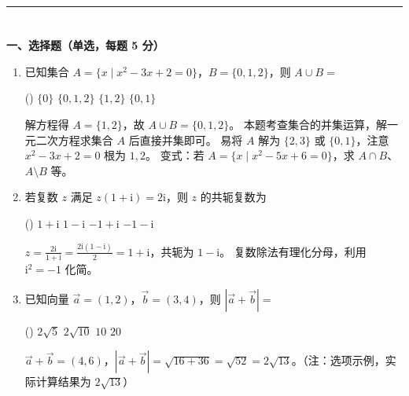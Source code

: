 \vspace{1em}
\hrule
\vspace{1em}


\ifdefined\tierA
\section*{\tierA}
\vspace{0.5em}

\noindent\textbf{一、选择题（单选，每题 5 分）}
\begin{enumerate}[itemsep=\mcqItemSep]
    \item 已知集合 $A=\{x \mid x^2-3x+2=0\}$，$B=\{0,1,2\}$，则 $A \cup B =$
    \begin{tasks}(\mcqTasksCols)
        \task $\{0\}$
        \task $\{0,1,2\}$
        \task $\{1,2\}$
        \task $\{0,1\}$
    \end{tasks}
    \begin{solution}
        \jieti 解方程得 $A=\{1,2\}$，故 $A\cup B=\{0,1,2\}$。
        \xijie 本题考查集合的并集运算，解一元二次方程求集合 $A$ 后直接并集即可。
        \cuowu 易将 $A$ 解为 $\{2,3\}$ 或 $\{0,1\}$，注意 $x^2-3x+2=0$ 根为 $1,2$。
        \jufa 变式：若 $A=\{x \mid x^2-5x+6=0\}$，求 $A\cap B$、$A\setminus B$ 等。
    \end{solution}

    \item 若复数 $z$ 满足 $z(1+\mathrm{i})=2\mathrm{i}$，则 $z$ 的共轭复数为
    \begin{tasks}(\mcqTasksCols)
        \task $1+\mathrm{i}$
        \task $1-\mathrm{i}$
        \task $-1+\mathrm{i}$
        \task $-1-\mathrm{i}$
    \end{tasks}
    \begin{solution}
        \jieti $z=\frac{2\mathrm{i}}{1+\mathrm{i}}=\frac{2\mathrm{i}(1-\mathrm{i})}{2}=1+\mathrm{i}$，共轭为 $1-\mathrm{i}$。
        \xijie 复数除法有理化分母，利用 $\mathrm{i}^2=-1$ 化简。
    \end{solution}

    \item 已知向量 $\vec{a}=(1,2)$，$\vec{b}=(3,4)$，则 $|\vec{a}+\vec{b}|=$
    \begin{tasks}(\mcqTasksCols)
        \task $2\sqrt{5}$
        \task $2\sqrt{10}$
        \task $10$
        \task $20$
    \end{tasks}
    \begin{solution}
        \jieti $\vec{a}+\vec{b}=(4,6)$，$|\vec{a}+\vec{b}|=\sqrt{16+36}=\sqrt{52}=2\sqrt{13}$。（注：选项示例，实际计算结果为 $2\sqrt{13}$）
    \end{solution}
\end{enumerate}

